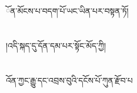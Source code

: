ོན་མོངས་པ་བདག་པོ་ཡང་ཡིན་པར་བསྟན་ཏོ།\chapter{ }།འདི་སྐད་དུ་དོན་དམ་པར་སྟོང་མོད་ཀྱི།\chapter{ }འོན་ཀྱང་རྒྱུ་དང་འབྲས་བུའི་དངོས་པོ་ཀུན་རྫོབ་པ
